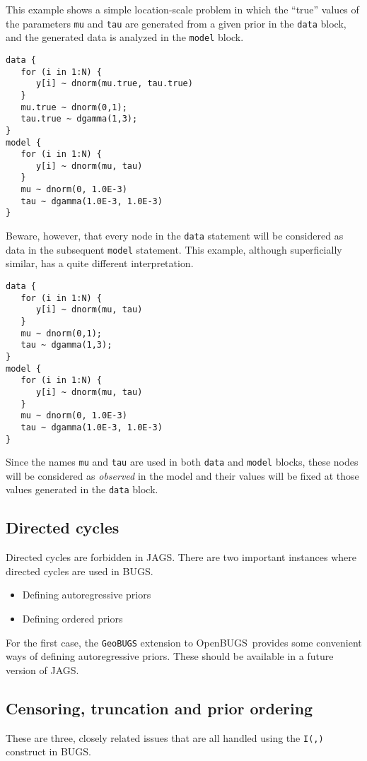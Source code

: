 \documentclass[11pt, a4paper, titlepage]{report}
\newcommand{\JAGS}{\textsf{JAGS}}
\newcommand{\BUGS}{\textsf{BUGS}}
\newcommand{\OpenBUGS}{\textsf{OpenBUGS}}
\begin{document}
This example shows a simple location-scale problem in which the ``true''
values of the parameters \texttt{mu} and \texttt{tau} are generated
from a given prior in the \texttt{data} block, and the generated
data is analyzed in the \texttt{model} block.
\begin{verbatim}
data {
   for (i in 1:N) {
      y[i] ~ dnorm(mu.true, tau.true) 
   }
   mu.true ~ dnorm(0,1);
   tau.true ~ dgamma(1,3);
}
model {
   for (i in 1:N) {
      y[i] ~ dnorm(mu, tau)
   }
   mu ~ dnorm(0, 1.0E-3)
   tau ~ dgamma(1.0E-3, 1.0E-3)
}
\end{verbatim}
Beware, however, that every node in the \texttt{data} statement will
be considered as data in the subsequent \texttt{model} statement. This
example, although superficially similar, has a quite different interpretation.
\begin{verbatim}
data {
   for (i in 1:N) {
      y[i] ~ dnorm(mu, tau) 
   }
   mu ~ dnorm(0,1);
   tau ~ dgamma(1,3);
}
model {
   for (i in 1:N) {
      y[i] ~ dnorm(mu, tau)
   }
   mu ~ dnorm(0, 1.0E-3)
   tau ~ dgamma(1.0E-3, 1.0E-3)
}
\end{verbatim}
Since the names \texttt{mu} and \texttt{tau} are used in both
\texttt{data} and \texttt{model} blocks, these nodes will be
considered as {\em observed} in the model and their values will be
fixed at those values generated in the \texttt{data} block.

\subsection{Directed cycles}

Directed cycles are forbidden in \JAGS. There are two important
instances where directed cycles are used in \BUGS.
\begin{itemize}
\item Defining autoregressive priors
\item Defining ordered priors
\end{itemize}
For the first case, the \texttt{GeoBUGS} extension to \OpenBUGS\ provides
some convenient ways of defining autoregressive priors. These should be
available in a future version of \JAGS.

\subsection{Censoring, truncation and prior ordering}
\label{section:censoring}

These are three, closely related issues that are all handled using
the \texttt{I(,)} construct in \BUGS.
\end{document}
